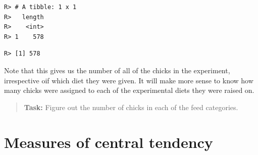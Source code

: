 \documentclass[english,10pt,a4paper,oneside]{book}
\newenvironment{Shaded}{\begin{snugshade}}{\end{snugshade}}
\newcommand{\CommentTok}[1]{\textcolor[rgb]{0.56,0.35,0.01}{\textit{#1}}}
\newcommand{\KeywordTok}[1]{\textcolor[rgb]{0.13,0.29,0.53}{\textbf{#1}}}
\newcommand{\NormalTok}[1]{#1}
\newcommand{\OperatorTok}[1]{\textcolor[rgb]{0.81,0.36,0.00}{\textbf{#1}}}
\theoremstyle{definition}
\theoremstyle{definition}
\theoremstyle{definition}
\theoremstyle{remark}
\begin{document}
\begin{verbatim}
R> # A tibble: 1 x 1
R>   length
R>    <int>
R> 1    578
\end{verbatim}

\begin{Shaded}
\end{Shaded}

\begin{verbatim}
R> [1] 578
\end{verbatim}

Note that this gives us the number of all of the chicks in the
experiment, irrespective oif which diet they were given. It will make
more sense to know how many chicks were assigned to each of the
experimental diets they were raised on.

\begin{quote}
\textbf{Task:} Figure out the number of chicks in each of the feed
categories.
\end{quote}

\hypertarget{measures-of-central-tendency}{%
\section{Measures of central
tendency}\label{measures-of-central-tendency}}
\end{document}
